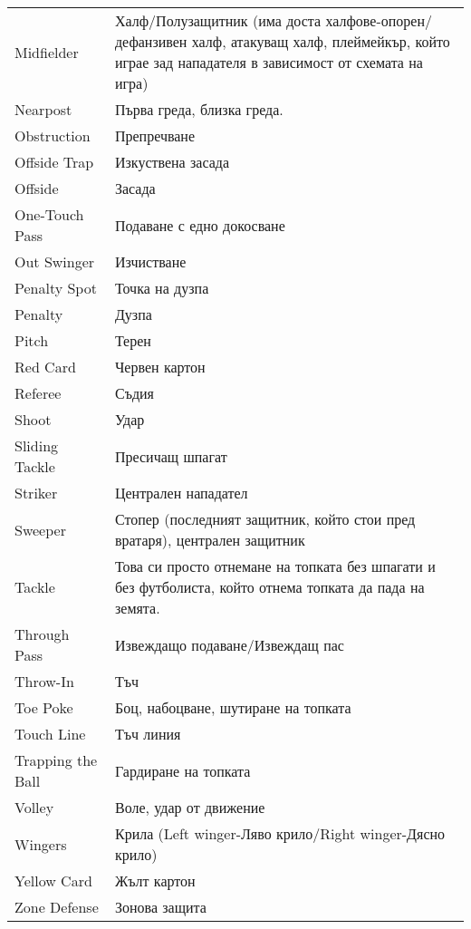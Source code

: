 \begin{longtable}{|p{}|p{}|}
Midfielder&Халф/Полузащитник (има доста халфове-опорен/дефанзивен халф, атакуващ халф, плеймейкър, който играе зад нападателя в зависимост от схемата на игра)\\ 
Nearpost&Първа греда, близка греда.\\ 
Obstruction&Препречване\\ 
Offside Trap&Изкуствена засада\\ 
Offside&Засада\\ 
One-Touch Pass&Подаване с едно докосване\\ 
Out Swinger&Изчистване\\ 
Penalty Spot&Точка на дузпа\\ 
Penalty&Дузпа\\ 
Pitch&Терен\\ 
Red Card&Червен картон\\ 
Referee&Съдия\\ 
Shoot&Удар\\ 
Sliding Tackle&Пресичащ шпагат\\ 
Striker&Централен нападател\\ 
Sweeper&Стопер (последният защитник, който стои пред вратаря), централен защитник\\ 
Tackle&Това си просто отнемане на топката без шпагати и без футболиста, който отнема топката да пада на земята.\\ 
Through Pass&Извеждащо подаване/Извеждащ пас\\ 
Throw-In&Тъч\\ 
Toe Poke&Боц, набоцване, шутиране на топката\\ 
Touch Line&Тъч линия\\ 
Trapping the Ball&Гардиране на топката\\ 
Volley&Воле, удар от движение\\ 
Wingers&Крила (Left winger-Ляво крило/Right winger-Дясно крило)\\ 
Yellow Card&Жълт картон\\ 
Zone Defense&Зонова защита

\end{longtable}

